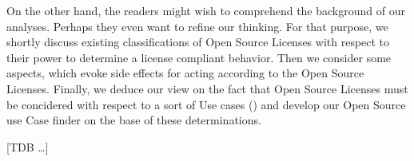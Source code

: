 On the other hand, the readers might wish to comprehend the background of our
analyses. Perhaps they even want to refine our thinking. For that purpose, we
shortly discuss existing classifications of Open Source Licenses with respect to
their power to determine a license compliant behavior. Then we consider some
aspects, which evoke side effects for acting according to the Open Source
Licenses. Finally, we deduce our view on the fact that Open Source Licenses must be
concidered with respect to a sort of Use cases () and develop our Open Source use
Case finder on the base of these determinations.


[TDB \ldots]

%
